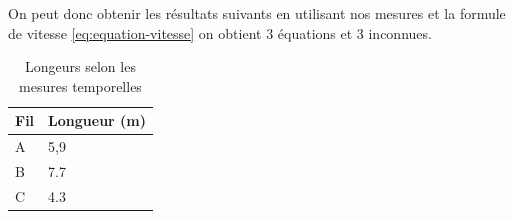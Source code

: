  On peut donc obtenir les résultats suivants en utilisant nos mesures et la formule de vitesse \ref{eq:equation-vitesse} on obtient 3 équations
 et 3 inconnues.

 \begin{center}
 \begin{table}[H]
 \caption{Longeurs selon les mesures temporelles} \label{tab:tableau longueur temporel}
 \begin{tabularx}{\textwidth}{ X X }
     Fil & Longueur (m) \\
     \hline
     \hline
     A & 5,9 \\
     B & 7.7 \\
     C & 4.3 \\
     \hline
 \end{tabularx}
 \end{table}
 \end{center}
